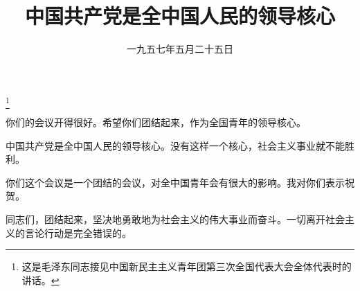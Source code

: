 
\title{中国共产党是全中国人民的领导核心}
\date{一九五七年五月二十五日}
\thanks{这是毛泽东同志接见中国新民主主义青年团第三次全国代表大会全体代表时的讲话。}
\maketitle


你们的会议开得很好。希望你们团结起来，作为全国青年的领导核心。

中国共产党是全中国人民的领导核心。没有这样一个核心，社会主义事业就不能胜利。

你们这个会议是一个团结的会议，对全中国青年会有很大的影响。我对你们表示祝贺。

同志们，团结起来，坚决地勇敢地为社会主义的伟大事业而奋斗。一切离开社会主义的言论行动是完全错误的。
